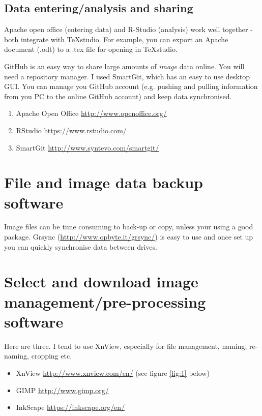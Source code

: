 \documentclass[letterpaper]{article}
\begin{document}
\subsection{Data entering/analysis and sharing}
Apache open office (entering data) and R-Studio (analysis) work well together - both integrate with TeXstudio. For example, you can export an Apache document (.odt) to a .tex file for opening in TeXstudio.

GitHub is an easy way to share large amounts of \emph{image} data online. You will need a repository manager. I used SmartGit, which has an easy to use desktop GUI. You can  manage you GitHub account (e.g. pushing and pulling information from you PC to the online GitHub account) and keep data synchronised.

\begin{enumerate}
\item Apache Open Office \url{http://www.openoffice.org/}
\item RStudio \url{https://www.rstudio.com/}
\item SmartGit \url{http://www.syntevo.com/smartgit/}
\end{enumerate}

\section{File and image data backup software}
Image files can be time consuming to back-up or copy, unless your using a good package. Grsync \label{Grsync} (\url{http://www.opbyte.it/grsync/}) is easy to use and once set up you can quickly synchronise data between drives.

\section{Select and download image management/pre-processing software}
Here are three. I tend to use XnView, especially for file management, naming, re-naming, cropping etc.


\begin{itemize}
\item XnView \url{http://www.xnview.com/en/} (see figure \ref{fig:1} below)
\item GIMP \url{http://www.gimp.org/}
\item InkScape \url{https://inkscape.org/en/}
\end{itemize}
\end{document}
